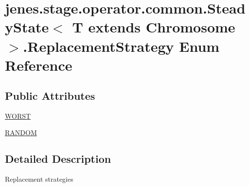 \hypertarget{enumjenes_1_1stage_1_1operator_1_1common_1_1_steady_state_3_01_t_01extends_01_chromosome_01_4_1_1_replacement_strategy}{\section{jenes.\-stage.\-operator.\-common.\-Steady\-State$<$ T extends Chromosome $>$.Replacement\-Strategy Enum Reference}
\label{enumjenes_1_1stage_1_1operator_1_1common_1_1_steady_state_3_01_t_01extends_01_chromosome_01_4_1_1_replacement_strategy}
}
\subsection*{Public Attributes}
\begin{DoxyCompactItemize}
\item 
\hyperlink{enumjenes_1_1stage_1_1operator_1_1common_1_1_steady_state_3_01_t_01extends_01_chromosome_01_4_1_1_replacement_strategy_a7cc73c0ae9c2f979dc4bb8aa9000582e}{W\-O\-R\-S\-T}
\item 
\hyperlink{enumjenes_1_1stage_1_1operator_1_1common_1_1_steady_state_3_01_t_01extends_01_chromosome_01_4_1_1_replacement_strategy_a601f61ea7c6745372f4ddc663636c2fb}{R\-A\-N\-D\-O\-M}
\end{DoxyCompactItemize}


\subsection{Detailed Description}
Replacement strategies 


